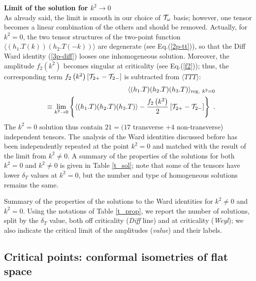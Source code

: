 \documentclass[11pt]{article}
\newcommand{\bea}{\begin{eqnarray}}
\newcommand{\eea}{\end{eqnarray}}
\def\nl{\nonumber\\}
\def\bra{\langle}
\def\ket{\rangle}
\def\dt{{\delta_T}} %
\begin{document}
\bigskip


\noindent
{\bf Limit of the solution for $k^2\to 0$}\\
As already said, the limit is smooth in our choice of ${\cal T}_\omega$ 
basis; however, one tensor becomes a linear combination of the others
and should be removed.
Actually, for $k^2=0$, the two tensor structures of the two-point function 
$\bra \left(h_1.T(k)\right) \left(h_2.T(-k)\right)\ket$
are degenerate (see Eq.(\ref{2p-tt})), so that the Diff
Ward identity (\ref{3p-diff}) looses one inhomogeneous solution.
Moreover, the amplitude $f_2\left(k^2\right)$ becomes singular
at criticality (see Eq.(\ref{f2})); thus, the corresponding term 
$f_2\left(k^2\right)\left[ {\cal T}_{2+}-{\cal T}_{2-} \right]$
is subtracted from $\bra TTT\ket$:
\bea
&& \bra (h_1.T)(h_2.T)(h_3.T)\ket_{{\rm reg},\ k^2=0} \nl
&& \equiv 
\lim_{k^2\to 0} \left\{ \bra (h_1.T)(h_2.T)(h_3.T)\ket 
- \frac{f_2\left(k^2\right)}{2}\left[ {\cal T}_{2+}-{\cal T}_{2-} \right]
\right\} \ .
\label{k0lim}
\eea
The $k^2=0$ solution thus contain $21=(17$ transverse $+4$
non-transverse) independent tensors. The analysis of the Ward identities
discussed before has been independently repeated at the point $k^2=0$ 
and matched with the result of the limit from $k^2\neq 0$. 
A summary of the properties of the solutions for both $k^2=0$ and 
$k^2\neq 0$ is given in Table \ref{t_sol}; note that
some of the tensors have lower $\dt$ values at $k^2=0$,
but the number and type of homogeneous solutions remains the same.

\bigskip


\begin{table}
\begin{center}

\caption{Summary of the properties of the solutions to the Ward identities
for $k^2\neq 0$ and $k^2 = 0$. Using the notations of Table \ref{t_prop},
we report the number of solutions, split by the $\dt$ value,
both off criticality ({\it Diff} line) and
at criticality ({\it Weyl}); we also indicate
the critical limit of the amplitudes ({\it value}) and their labels.}
\label{t_sol}
\end{center}
\end{table}




\subsection{Critical points: conformal isometries of flat space}
\end{document}
